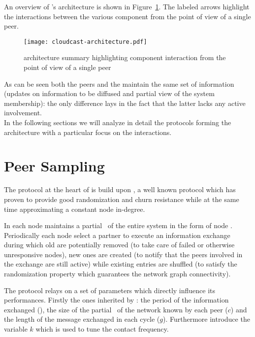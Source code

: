 An overview of \cloudcast's architecture is shown in
Figure~\ref{fig:cloudcast-architecture}. The labeled arrows highlight the
interactions between the various component from the point of view of a
single peer.

\begin{figure}
  \texttt{[image: cloudcast-architecture.pdf]}
  \caption{\cloudcast architecture summary highlighting component
    interaction from the point of view of a single peer}
  \label{fig:cloudcast-architecture}
\end{figure}

As can be seen both the peers and the \cloud maintain the same set of
information (updates on information to be diffused and partial view of
the system membership): the only difference lays in the fact that the latter
lacks any active involvement.
\ \\
In the following sections we will analyze in detail the protocols
forming the \cloudcast architecture with a particular focus on the
\cloud interactions.

\section{Peer Sampling}
The \peersampling protocol at the heart of \cloudcast is build upon
\cyclon \cite{CYCLON}, a well known \peersampling \gossip protocol
which has proven to provide good randomization and churn resistance
while at the same time approximating a constant node in-degree.

In \cloudcast each node maintains a partial \view\ of the entire system
in the form of node \descriptors. Periodically each node select
a partner to execute an information exchange during which old
\descriptors are potentially removed (to take care of failed or
otherwise unresponsive nodes), new ones are created (to notify that the
peers involved in the exchange are still active) while existing
entries are shuffled (to satisfy the randomization property which
guarantees the network graph connectivity).

The protocol relays on a set of parameters which directly influence its
performances. Firstly the ones inherited by \cyclon: the period of
the information exchanged (\deltacyclon), the size of the partial
\view\ of the network known by each peer ($c$) and the length
of the message exchanged in each cycle ($g$). Furthermore
\cloudcast introduce the variable $k$ which is used to tune the
\cloud contact frequency.

